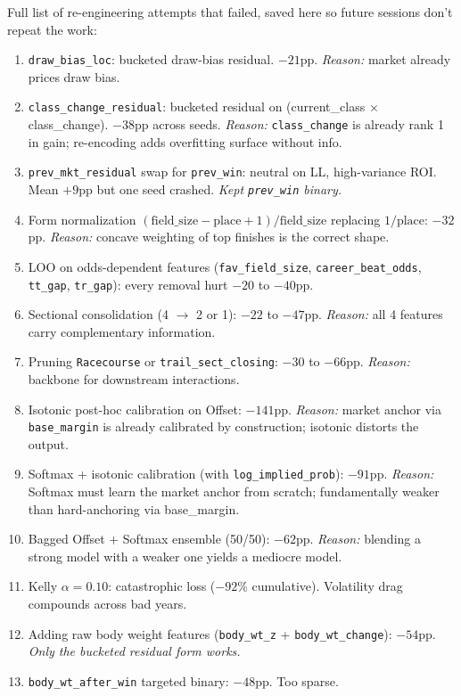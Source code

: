 \documentclass[11pt]{article}
\begin{document}
Full list of re-engineering attempts that failed, saved here so future
sessions don't repeat the work:

\begin{enumerate}\item \texttt{draw\_bias\_loc}: bucketed draw-bias residual. $-21$pp.
      \emph{Reason:} market already prices draw bias.
\item \texttt{class\_change\_residual}: bucketed residual on
      (current\_class $\times$ class\_change). $-38$pp across seeds.
      \emph{Reason:} \texttt{class\_change} is already rank 1 in gain;
      re-encoding adds overfitting surface without info.
\item \texttt{prev\_mkt\_residual} swap for \texttt{prev\_win}: neutral
      on LL, high-variance ROI. Mean $+9$pp but one seed crashed.
      \emph{Kept \texttt{prev\_win} binary.}
\item Form normalization $(\text{field\_size} - \text{place} + 1)/\text{field\_size}$
      replacing $1/\text{place}$: $-32$pp.
      \emph{Reason:} concave weighting of top finishes is the correct
      shape.
\item LOO on odds-dependent features (\texttt{fav\_field\_size},
      \texttt{career\_beat\_odds}, \texttt{tt\_gap}, \texttt{tr\_gap}):
      every removal hurt $-20$ to $-40$pp.
\item Sectional consolidation (4 $\to$ 2 or 1): $-22$ to $-47$pp.
      \emph{Reason:} all 4 features carry complementary information.
\item Pruning \texttt{Racecourse} or \texttt{trail\_sect\_closing}: $-30$
      to $-66$pp.
      \emph{Reason:} backbone for downstream interactions.
\item Isotonic post-hoc calibration on Offset: $-141$pp.
      \emph{Reason:} market anchor via \texttt{base\_margin} is already
      calibrated by construction; isotonic distorts the output.
\item Softmax + isotonic calibration (with \texttt{log\_implied\_prob}):
      $-91$pp.
      \emph{Reason:} Softmax must learn the market anchor from scratch;
      fundamentally weaker than hard-anchoring via base\_margin.
\item Bagged Offset + Softmax ensemble (50/50): $-62$pp.
      \emph{Reason:} blending a strong model with a weaker one yields a
      mediocre model.
\item Kelly $\alpha = 0.10$: catastrophic loss ($-92\%$ cumulative).
      Volatility drag compounds across bad years.
\item Adding raw body weight features (\texttt{body\_wt\_z} +
      \texttt{body\_wt\_change}): $-54$pp. \emph{Only the bucketed
      residual form works.}
\item \texttt{body\_wt\_after\_win} targeted binary: $-48$pp. Too sparse.
\end{enumerate}
\end{document}
